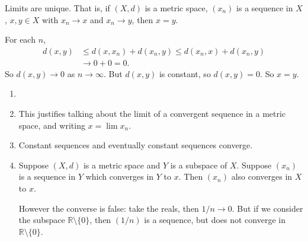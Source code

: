 \documentclass[12pt]{article}
\begin{document}
\begin{proposition}
	Limits are unique. That is, if $(X, d)$ is a metric space, $(x_n)$ is a sequence in $X$, $x, y \in X$ with $x_n \to x$ and $x_n \to y$, then $x = y$.
\end{proposition}

\begin{proofbox}
	For each $n$,
\begin{align*}
	d(x, y) &\leq d(x, x_n) + d(x_n, y) \leq d(x_n, x) + d(x_n, y) \\
		&\to 0 + 0 = 0.
\end{align*}
So $d(x, y) \to 0$ as $n \to \infty$. But $d(x, y)$ is constant, so $d(x, y) = 0$. So $x = y$.
\end{proofbox}

\begin{remark}
	\begin{enumerate}[1.]
		\item[]
		\item This justifies talking about the limit of a convergent sequence in a metric space, and writing $x = \lim x_n$.
		\item Constant sequences and eventually constant sequences converge.
		\item Suppose $(X, d)$ is a metric space and $Y$ is a subspace of $X$. Suppose $(x_n)$ is a sequence in $Y$ which converges in $Y$ to $x$. Then $(x_n)$ also converges in $X$ to $x$.

			However the converse is false: take the reals, then $1/n \to 0$. But if we consider the subspace $\mathbb{R} \setminus \{0\}$, then $(1/n)$ is a sequence, but does not converge in $\mathbb{R} \setminus \{0\}$.
	\end{enumerate}
\end{remark}
\end{document}
